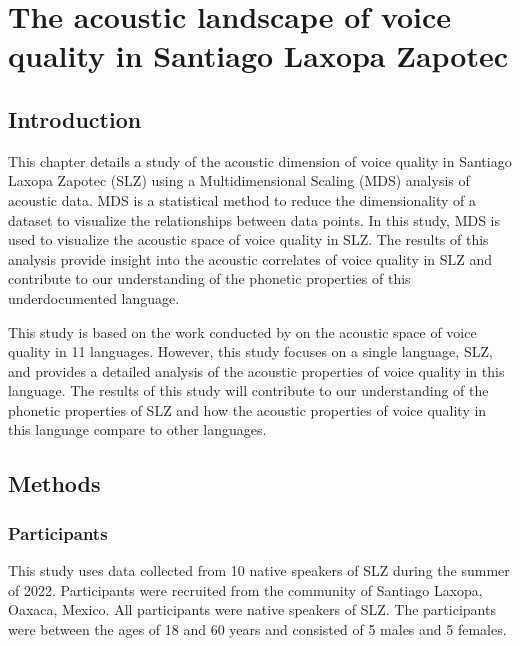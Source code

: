 \chapter{The acoustic landscape of voice quality in Santiago Laxopa Zapotec} \label{ch:acousticlandscape}

\section{Introduction} \label{sec:acousticlandscape:intro}

This chapter details a study of the acoustic dimension of voice quality in Santiago Laxopa Zapotec (SLZ) using a Multidimensional Scaling (MDS) analysis of acoustic data. MDS is a statistical method to reduce the dimensionality of a dataset to visualize the relationships between data points. In this study, MDS is used to visualize the acoustic space of voice quality in SLZ. The results of this analysis provide insight into the acoustic correlates of voice quality in SLZ and contribute to our understanding of the phonetic properties of this underdocumented language.

This study is based on the work conducted by \citet{keatingCrosslanguageAcousticSpace2023} on the acoustic space of voice quality in 11 languages. However, this study focuses on a single language, SLZ, and provides a detailed analysis of the acoustic properties of voice quality in this language. The results of this study will contribute to our understanding of the phonetic properties of SLZ and how the acoustic properties of voice quality in this language compare to other languages.

\section{Methods} \label{sec:acousticlandscape:methods}
\subsection{Participants} \label{sec:acousticlandscape:participants}

This study uses data collected from 10 native speakers of SLZ during the summer of 2022. Participants were recruited from the community of Santiago Laxopa, Oaxaca, Mexico. All participants were native speakers of SLZ. The participants were between the ages of 18 and 60 years and consisted of 5 males and 5 females.
